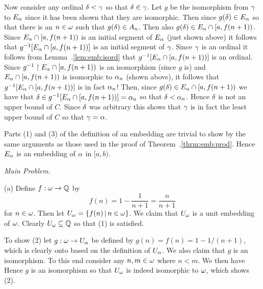 \begin{solution}
{        Now consider any ordinal $\delta < \gamma$ so that $\delta \in \gamma$.
        Let $g$ be the isomorphism from $\gamma$ to $E_\alpha$ since it has been shown that they are isomorphic.
        Then since $g(\delta) \in E_\alpha$ so that there is an $n \in \omega$ such that $g(\delta) \in A_n$.
        Then also $g(\delta) \in E_\alpha \cap [a, f(n+1))$.
        Since $E_\alpha \cap [a, f(n+1))$ is an initial segment of $E_\alpha$ (just shown above) it follows that $g^{-1}[E_\alpha \cap [a, f(n+1))]$ is an initial segment of $\gamma$.
        Since $\gamma$ is an ordinal it follows from Lemma~\ex.\ref{lem:emb:isord} that $g^{-1}[E_\alpha \cap [a, f(n+1))]$ is an ordinal.
        Since $g^{-1} \restriction E_\alpha \cap [a, f(n+1))$ is an isomorphism (since $g$ is) and $E_\alpha \cap [a, f(n+1))$ is isomorphic to $\alpha_n$ (shown above), it follows that $g^{-1}[E_\alpha \cap [a, f(n+1))]$ is in fact $\alpha_n$!
        Then, since $g(\delta) \in E_\alpha \cap [a, f(n+1))$ we have that $\delta \in g^{-1}[E_\alpha \cap [a, f(n+1))] = \alpha_n$ so that $\delta < \alpha_n$.
        Hence $\delta$ is not an upper bound of $C$.
        Since $\delta$ was arbitrary this shows that $\gamma$ is in fact the least upper bound of $C$ so that $\gamma = \alpha$.

        Parts (1) and (3) of the definition of an embedding are trivial to show by the same arguments as those used in the proof of Theorem~\ex.\ref{thrm:emb:prod}.
        Hence $E_\alpha$ is an embedding of $\alpha$ in $[a,b)$. \qedsymbol
    }
    
    \emph{Main Problem.}

    (a) Define $f: \omega \to \mathbb{Q}$ by
    $$
    f(n) = 1 - \frac{1}{n+1} = \frac{n}{n+1}
    $$
    for $n \in \omega$.
    Then let $U_\omega = \left\{ f(n) \,|\, n \in \omega \right\}$.
    We claim that $U_\omega$ is a unit embedding of $\omega$.
    Clearly $U_\omega \subseteq \mathbb{Q}$ so that (1) is satisfied.

    To show (2) let $g: \omega \to U_\alpha$ be defined by $g(n) = f(n) = 1 - 1/(n+1)$, which is clearly onto based on the definition of $U_\alpha$.
    We also claim that $g$ is an isomorphism.
    To this end consider any $n,m \in \omega$ where $n < m$.
    We then have
    Hence $g$ is an isomorphism so that $U_\omega$ is indeed isomorphic to $\omega$, which shows (2).


\end{solution}

